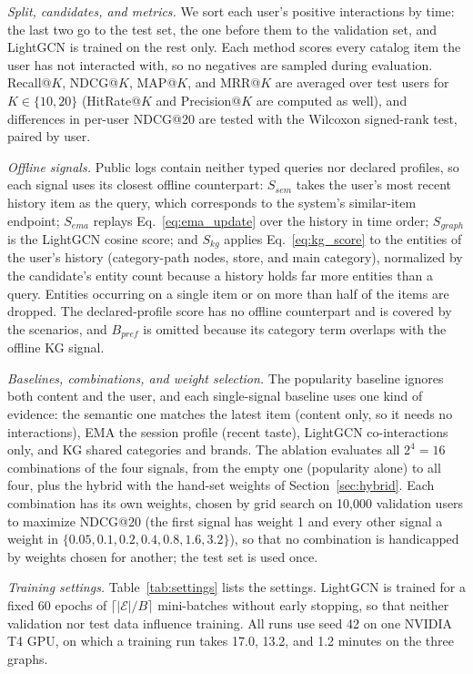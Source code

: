 \documentclass[3p,times,procedia]{elsarticle}
\begin{document}
\emph{Split, candidates, and metrics.} We sort each user's positive interactions by time: the last two go to the test set, the one before them to the validation set, and LightGCN is trained on the rest only. Each method scores every catalog item the user has not interacted with, so no negatives are sampled during evaluation. Recall@$K$, NDCG@$K$, MAP@$K$, and MRR@$K$ are averaged over test users for $K\in\{10,20\}$ (HitRate@$K$ and Precision@$K$ are computed as well), and differences in per-user NDCG@20 are tested with the Wilcoxon signed-rank test, paired by user.

\emph{Offline signals.} Public logs contain neither typed queries nor declared profiles, so each signal uses its closest offline counterpart: $S_{\mathit{sem}}$ takes the user's most recent history item as the query, which corresponds to the system's similar-item endpoint; $S_{\mathit{ema}}$ replays Eq.~\eqref{eq:ema_update} over the history in time order; $S_{\mathit{graph}}$ is the LightGCN cosine score; and $S_{\mathit{kg}}$ applies Eq.~\eqref{eq:kg_score} to the entities of the user's history (category-path nodes, store, and main category), normalized by the candidate's entity count because a history holds far more entities than a query. Entities occurring on a single item or on more than half of the items are dropped. The declared-profile score has no offline counterpart and is covered by the scenarios, and $B_{\mathit{pref}}$ is omitted because its category term overlaps with the offline KG signal.

\emph{Baselines, combinations, and weight selection.} The popularity baseline ignores both content and the user, and each single-signal baseline uses one kind of evidence: the semantic one matches the latest item (content only, so it needs no interactions), EMA the session profile (recent taste), LightGCN co-interactions only, and KG shared categories and brands. The ablation evaluates all $2^4=16$ combinations of the four signals, from the empty one (popularity alone) to all four, plus the hybrid with the hand-set weights of Section~\ref{sec:hybrid}. Each combination has its own weights, chosen by grid search on 10,000 validation users to maximize NDCG@20 (the first signal has weight 1 and every other signal a weight in $\{0.05,0.1,0.2,0.4,0.8,1.6,3.2\}$), so that no combination is handicapped by weights chosen for another; the test set is used once.

\emph{Training settings.} Table~\ref{tab:settings} lists the settings. LightGCN is trained for a fixed 60 epochs of $\lceil|\mathcal{E}|/B\rceil$ mini-batches without early stopping, so that neither validation nor test data influence training. All runs use seed 42 on one NVIDIA T4 GPU, on which a training run takes 17.0, 13.2, and 1.2 minutes on the three graphs.
\end{document}
